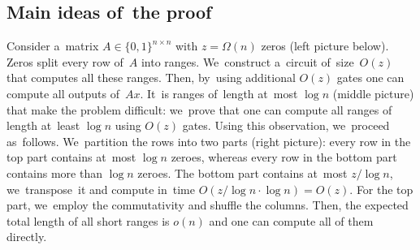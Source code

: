 \documentclass{toc}
\begin{document}
\subsection{Main ideas of~the proof}

Consider a~matrix $A \in \{0,1\}^{n \times n}$
with $z=\Omega(n)$ zeros (left picture below).
Zeros split every row of~$A$ into ranges.
We~construct a~circuit of~size~$O(z)$ that computes all these ranges. Then, by~using additional $O(z)$ gates one can
compute all outputs of~$Ax$. It~is ranges of~length at~most $\log n$ (middle picture) that make the problem difficult:
we~prove that one can compute
all ranges of length at~least $\log n$ using $O(z)$ gates.
Using this observation, we~proceed as~follows.
We~partition the rows into two parts (right picture): every row in the top part contains at~most $\log n$ zeroes, whereas every row in the bottom part contains more than $\log n$ zeroes. The bottom part contains at~most $z/\log n$, we~transpose~it and compute in~time $O(z/\log n \cdot \log n)=O(z)$. For the top part, we~employ the commutativity and shuffle the columns. Then, the expected total length of all short ranges is $o(n)$ and one can
compute all of them directly.
\end{document}
